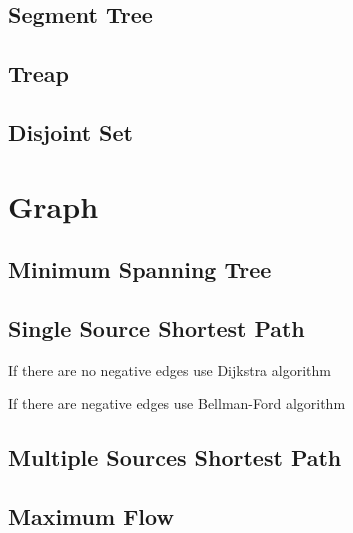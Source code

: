 \documentclass[a4paper,11pt]{article}
\begin{document}
  \subsection{Segment Tree}
        
    
  \subsection{Treap}
    
  
  \subsection{Disjoint Set}
        

\section{Graph}
  \subsection{Minimum Spanning Tree}
    

  \subsection{Single Source Shortest Path}
    If there are no negative edges use Dijkstra algorithm
        
    
    If there are negative edges use Bellman-Ford algorithm
    

  \subsection{Multiple Sources Shortest Path}
    
  
  \subsection{Maximum Flow}
    
  
\end{document}
